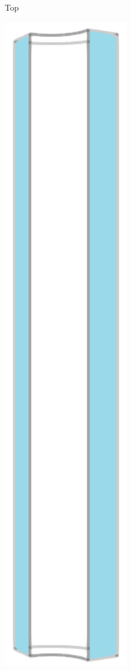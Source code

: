 \begin{figure}[!htb]
\begin{subfigure}{0.19\textwidth}
    \caption{Top}
  \end{subfigure}
  \begin{subfigure}{0.19\textwidth}
    \centering
    \includegraphics[width=0.6\textwidth]{Chapter5/figures/spallation/geometry_sides}

\end{subfigure}
\end{figure}
